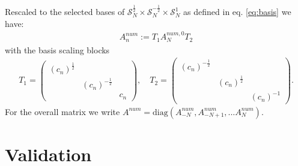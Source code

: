 \documentclass[12pt,journal,compsoc, onecolumn]{IEEEtran}
\begin{document}
Rescaled to the selected bases of $\mathcal{S}_N^{\frac{1}{2}}\times \mathcal{S}_N^{-\frac{1}{2}}\times \mathcal{S}_N^{1}$ as defined in eq. \ref{eq:basis} we have: 
\begin{align}
    \label{eq:galerkin_matrix}
    {A}^{num}_n := T_1 A^{num, 0}_N T_2
\end{align}
with the basis scaling blocks \begin{align}
    T_1 = 
    \begin{pmatrix}
    (c_n)^{\frac{1}{2}} & & \\
    &  (c_n)^{-\frac{1}{2}} & \\
    & &  c_n
    \end{pmatrix}, \quad
    T_2 = 
    \begin{pmatrix}
    (c_n)^{-\frac{1}{2}} & & \\
    &  (c_n)^{\frac{1}{2}} & \\
    & &  (c_n)^{-1}
    \end{pmatrix}.
    \nonumber
\end{align}
For the overall matrix we write $A^{num} = \mathrm{diag}(A_{-N}^{num}, A_{-N + 1}^{num}, ... A_{N}^{num})$.


 

\section{Validation}
\end{document}
